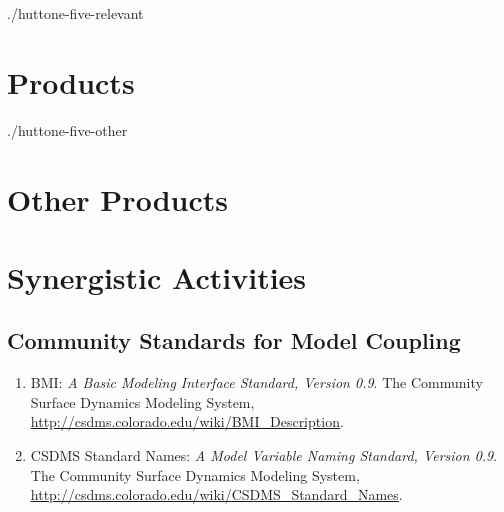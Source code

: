 \documentclass[letterpaper]{resume}
\begin{document}
\begin{btSect}{./huttone-five-relevant}
\section{Products}
\btPrintNotCited
\end{btSect}

\begin{btSect}{./huttone-five-other}
\section{Other Products}
\btPrintNotCited
\end{btSect}

\section{Synergistic Activities}
\renewcommand{\labelenumi}{[\arabic{enumi}]}

\subsection {Community Standards for Model Coupling}
\begin{enumerate}
  \setcounter{enumi}{0}
  \item BMI: \textit {A Basic Modeling Interface Standard, Version 0.9}. The Community Surface Dynamics Modeling System,
        \url {http://csdms.colorado.edu/wiki/BMI_Description}.
  \item CSDMS Standard Names: \textit {A Model Variable Naming Standard, Version 0.9}. The Community Surface Dynamics Modeling System,
        \url {http://csdms.colorado.edu/wiki/CSDMS_Standard_Names}.
\end{enumerate}
\end{document}
